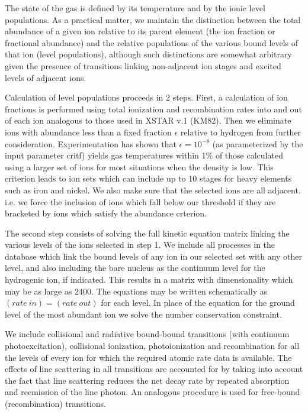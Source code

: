 The state of the gas is defined by its temperature and by the ionic level
populations.   As a practical matter, we maintain the distinction 
between the total abundance of a given ion relative to its parent 
element (the ion fraction or fractional abundance) and the relative 
populations of the various bound levels of that ion (level populations), 
although such distinctions are somewhat arbitrary given the presence of 
transitions  linking non-adjacent ion stages and excited levels of
adjacent ions.  

Calculation of level populations proceeds in 2 steps.
First, a calculation of ion fractions is performed using total ionization 
and recombination rates into and out of each ion analogous to those used in XSTAR v.1 (KM82).
Then we eliminate ions with abundance less than a fixed fraction $\epsilon$ relative to 
hydrogen from further consideration.  Experimentation has shown that 
$\epsilon=10^{-8}$ (as parameterized by the input parameter critf) 
yields gas temperatures within 1$\%$ of those calculated 
using a larger set of ions for most situations when the density is low.   
This criterion leads to ion 
sets which can include up to 10 stages for heavy elements such as iron and nickel.
We also make sure that the selected ions are all adjacent. i.e. we force the 
inclusion of ions which fall below our threshold if they are bracketed by 
ions which satisfy the abundance crterion.

The second step consists of solving the full kinetic equation matrix linking the 
various levels of the ions selected in step 1.  We include all processes in the 
database which link the bound levels of any ion in our selected set with any 
other level, and also including the bare nucleus as the continuum level for the 
hydrogenic ion, if indicated.  This results in a matrix with dimensionality
which may be as large as 2400.  The equations may be  written
schematically as $(rate\ in) = (rate\ out)$ for each level.  In place of the 
equation for the ground level of the most abundant ion we solve the number conservation 
constraint.

We include collisional and radiative bound-bound transitions
(with continuum photoexcitation), collisional
ionization, photoionization and  recombination for
all the levels of every ion for which the required atomic rate data is available.  
The  effects of line scattering in all transitions are accounted for 
by taking into account the fact that 
line scattering reduces the net decay rate by repeated 
absorption and reemission of the line photon.  
An analogous procedure is used for free-bound 
(recombination) transitions.

